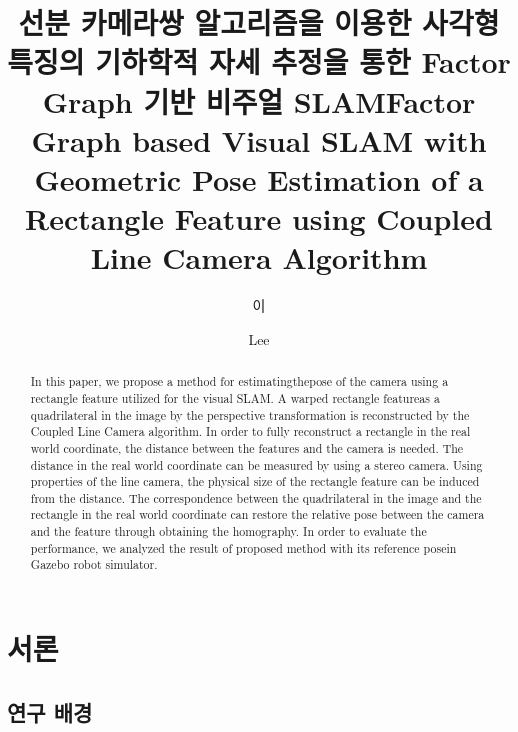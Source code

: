 \documentclass[master,korean,final]{cbnu-ecs}
\title[korean]{선분 카메라쌍 알고리즘을 이용한 사각형 특징의 기하학적 자세 추정을 통한 Factor Graph 기반 비주얼 SLAM}
\title[english]{Factor Graph based Visual SLAM with Geometric Pose Estimation of a Rectangle Feature using Coupled Line Camera Algorithm}
\author[korean] {이}{재 민}
\author[english]{Lee}{Jae-Min}
\begin{document}
\tableofcontents
\listoffigures
\listoftables
\begin{abstract}
In this paper, we propose a method for estimatingthepose of the camera using a rectangle feature utilized for the  visual SLAM.  A warped rectangle featureas a quadrilateral in the image by the perspective transformation is reconstructed by the Coupled Line Camera algorithm. In order to fully reconstruct a rectangle in the real world coordinate, the distance between the features and the camera is needed. The distance in the real world coordinate can be measured by using a stereo camera. Using properties of the line camera, the physical size of the rectangle  feature can be induced from the distance. The correspondence between the quadrilateral in the image and the rectangle in the real world coordinate can restore the relative pose between the camera and the feature through obtaining the homography. In order to evaluate the performance, we analyzed the result of proposed method with its reference posein Gazebo robot simulator.
\end{abstract}



\chapter{서론}
\section{연구 배경}
\end{document}
